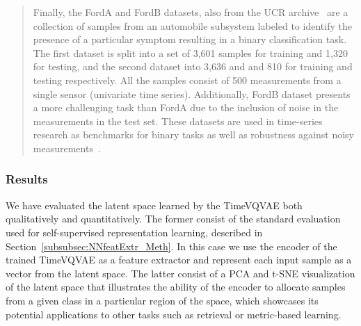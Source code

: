\begin{quote}
Finally, the FordA and FordB datasets, also from the UCR archive~\cite{2019_IEEE_ucr} are a collection of samples from an automobile subsystem labeled to identify the presence of a particular symptom resulting in a binary classification task. The first dataset is split into a set of 3,601 samples for training and 1,320 for testing, and the second dataset into 3,636 and and 810 for training and testing respectively. All the samples consist of 500 measurements from a single sensor (univariate time series). Additionally, FordB dataset presents a more challenging task than FordA due to the inclusion of noise in the measurements in the test set. These datasets are used in time-series research as benchmarks for binary tasks as well as robustness against noisy measurements~\cite{2021_ICML_voice2series, 2022_arxiv_hypertime, 2023_Springer_deep}.
\end{quote}
            
\subsubsection{Results}\label{subsubsec:VQVAE_Res}
We have evaluated the latent space learned by the TimeVQVAE both qualitatively and quantitatively. The former consist of the standard evaluation used for self-supervised representation learning, described in Section~\ref{subsubsec:NNfeatExtr_Meth}. In this case we use the encoder of the trained TimeVQVAE as a feature extractor and represent each input sample as a vector from the latent space. The latter consist of a PCA and t-SNE visualization of the latent space that illustrates the ability of the encoder to allocate samples from a given class in a particular region of the space, which showcases its potential applications to other tasks such as retrieval or metric-based learning.

